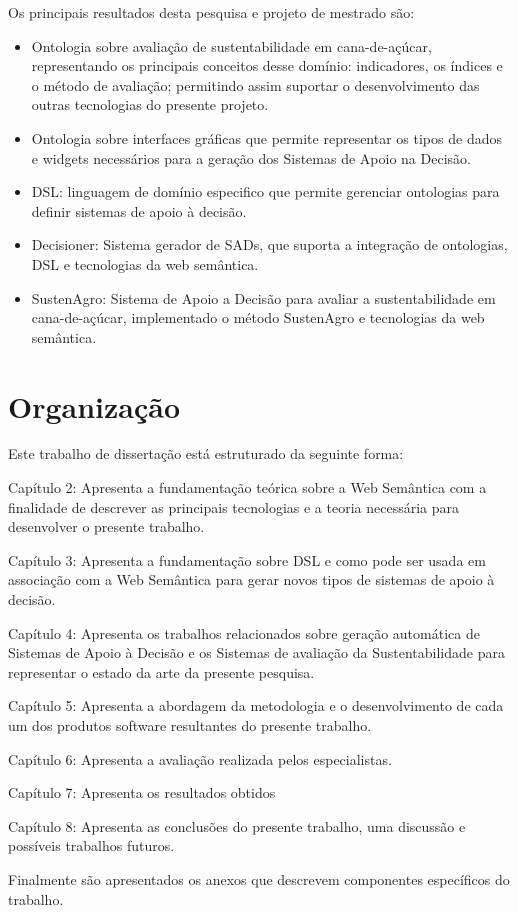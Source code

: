 Os principais resultados desta pesquisa e projeto de mestrado são:
\begin{itemize}
\item Ontologia sobre avaliação de sustentabilidade em cana-de-açúcar, representando
os principais conceitos desse domínio: indicadores, os índices e o
método de avaliação; permitindo assim suportar o desenvolvimento das
outras tecnologias do presente projeto.
\item Ontologia sobre interfaces gráficas que permite representar os tipos
de dados e \foreignlanguage{english}{widgets} necessários para a geração
dos Sistemas de Apoio na Decisão.
\item DSL: linguagem de domínio especifico que permite gerenciar ontologias
para definir sistemas de apoio à decisão.
\item Decisioner: Sistema gerador de SADs, que suporta a integração de ontologias,
DSL e tecnologias da web semântica.
\item SustenAgro: Sistema de Apoio a Decisão para avaliar a sustentabilidade
em cana-de-açúcar, implementado o método SustenAgro e tecnologias
da web semântica.
\end{itemize}

\section{Organização}

Este trabalho de dissertação está estruturado da seguinte forma: 

Capítulo 2: Apresenta a fundamentação teórica sobre a Web Semântica
com a finalidade de descrever as principais tecnologias e a teoria
necessária para desenvolver o presente trabalho.

Capítulo 3: Apresenta a fundamentação sobre DSL e como pode ser usada
em associação com a Web Semântica para gerar novos tipos de sistemas
de apoio à decisão.

Capítulo 4: Apresenta os trabalhos relacionados sobre geração automática
de Sistemas de Apoio à Decisão e os Sistemas de avaliação da Sustentabilidade
para representar o estado da arte da presente pesquisa. 

Capítulo 5: Apresenta a abordagem da metodologia e o desenvolvimento
de cada um dos produtos software resultantes do presente trabalho. 

Capítulo 6: Apresenta a avaliação realizada pelos especialistas.

Capítulo 7: Apresenta os resultados obtidos

Capítulo 8: Apresenta as conclusões do presente trabalho, uma discussão
e possíveis trabalhos futuros.

Finalmente são apresentados os anexos que descrevem componentes específicos
do trabalho.
